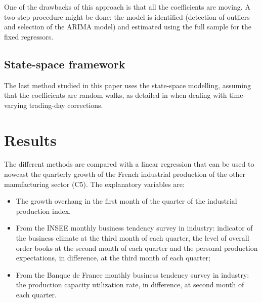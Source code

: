 \documentclass[12pt,a4paper]{article}
\begin{document}
One of the drawbacks of this approach is that all the coefficients are moving.
A two-step procedure might be done: the model is identified (detection of outliers and selection of the ARIMA model) and estimated using the full sample for the fixed regressors.

\subsection{State-space framework}

The last method studied in this paper uses the state-space modelling, assuming that the coefficients are random walks, as detailed in \citet{ch7HBSA} when dealing with time-varying trading-day corrections.

\section{Results}


The different methods are compared with a linear regression that can be used to nowcast the quarterly growth of the French industrial production of the other manufacturing sector (C5).
The explanatory variables are:

\begin{itemize}
\item
  The growth overhang in the first month of the quarter of the industrial production index.
\item
  From the INSEE monthly business tendency survey in industry: indicator of the business climate at the third month of each quarter, the level of overall order books at the second month of each quarter and the personal production expectations, in difference, at the third month of each quarter;
\item
  From the Banque de France monthly business tendency survey in industry: the production capacity utilization rate, in difference, at second month of each quarter.
\end{itemize}
\end{document}
